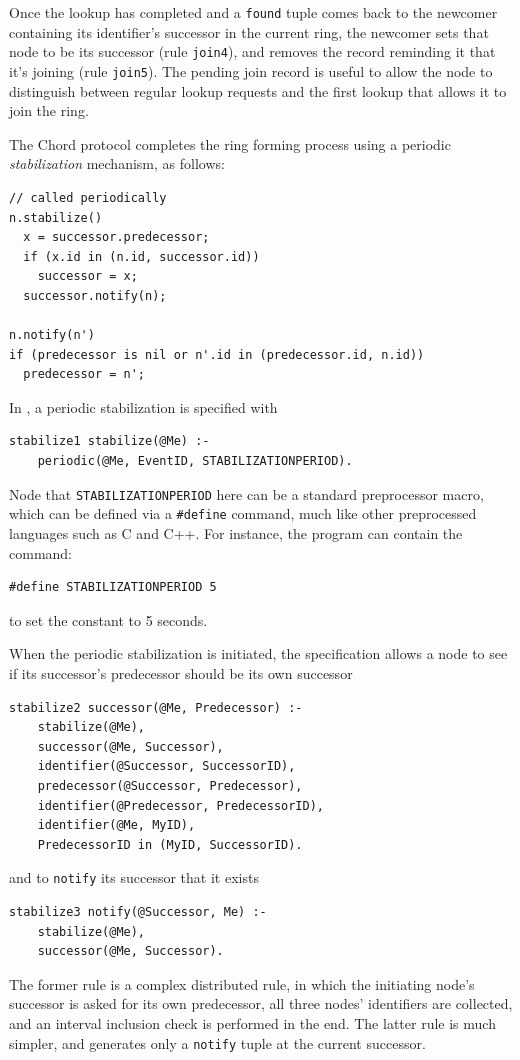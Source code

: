 \documentclass{article}
\begin{document}
Once the lookup has completed and a \lstinline$found$ tuple comes back
to the newcomer containing its identifier's successor in the current
ring, the newcomer sets that node to be its successor (rule
\lstinline$join4$), and removes the record reminding it that it's
joining (rule \lstinline$join5$).  The pending join record is useful to
allow the node to distinguish between regular lookup requests and the
first lookup that allows it to join the ring.

The Chord protocol completes the ring forming process using a
periodic \emph{stabilization} mechanism, as follows:
\begin{verbatim}
// called periodically
n.stabilize()
  x = successor.predecessor;
  if (x.id in (n.id, successor.id))
    successor = x;
  successor.notify(n);

n.notify(n')
if (predecessor is nil or n'.id in (predecessor.id, n.id))
  predecessor = n';
\end{verbatim}
In \ol, a periodic stabilization is specified with
\begin{lstlisting}
stabilize1 stabilize(@Me) :-
	periodic(@Me, EventID, STABILIZATIONPERIOD).
\end{lstlisting}
Node that \texttt{STABILIZATIONPERIOD} here can be a standard
preprocessor macro, which can be defined via a \texttt{\#define} command, much
like other preprocessed languages such as C and C++. For instance, the
\ol program can contain the command:
\begin{lstlisting}
#define STABILIZATIONPERIOD 5
\end{lstlisting}
to set the constant to 5 seconds.

When the periodic stabilization is initiated, the \ol specification
allows a node to see if its successor's predecessor should be its own
successor
\begin{lstlisting}
stabilize2 successor(@Me, Predecessor) :-
	stabilize(@Me),
	successor(@Me, Successor),
	identifier(@Successor, SuccessorID),
	predecessor(@Successor, Predecessor),
	identifier(@Predecessor, PredecessorID),
	identifier(@Me, MyID),
	PredecessorID in (MyID, SuccessorID).
\end{lstlisting}
and to \texttt{notify} its successor that it exists
\begin{lstlisting}
stabilize3 notify(@Successor, Me) :-
	stabilize(@Me),
	successor(@Me, Successor).
\end{lstlisting}
The former rule is a complex distributed rule, in which the initiating
node's successor is asked for its own predecessor, all three nodes'
identifiers are collected, and an interval inclusion check is performed
in the end.  The latter rule is much simpler, and generates only a
\lstinline$notify$ tuple at the current successor.
\end{document}
